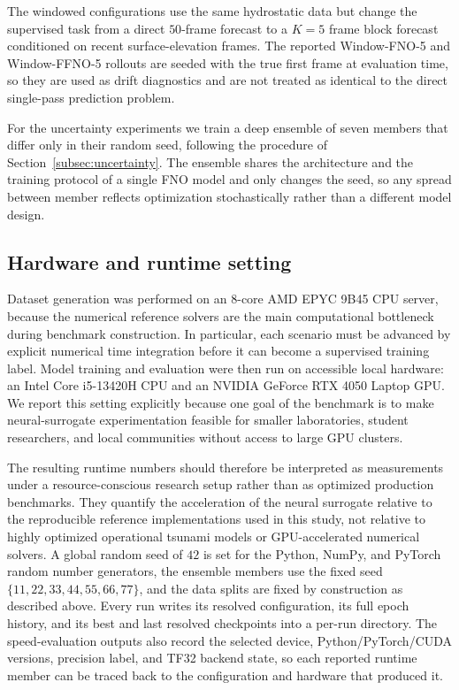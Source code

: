 The windowed configurations use the same hydrostatic data but change the supervised task from a direct $50$-frame forecast to a $K = 5$ frame block forecast conditioned on recent surface-elevation frames. The reported Window-FNO-5 and Window-FFNO-5 rollouts are seeded with the true first frame at evaluation time, so they are used as drift diagnostics and are not treated as identical to the direct single-pass prediction problem.

For the uncertainty experiments we train a deep ensemble of seven members that differ only in their random seed, following the procedure of Section~\ref{subsec:uncertainty}. The ensemble shares the architecture and the training protocol of a single FNO model and only changes the seed, so any spread between member reflects optimization stochastically rather than a different model design.

\subsection{Hardware and runtime setting}
\label{subsec:train-hardware}

Dataset generation was performed on an 8-core AMD EPYC 9B45 CPU server, because the numerical reference solvers are the main computational bottleneck during benchmark construction. In particular, each scenario must be advanced by explicit numerical time integration before it can become a supervised training label. Model training and evaluation were then run on accessible local hardware: an Intel Core i5-13420H CPU and an NVIDIA GeForce RTX 4050 Laptop GPU. We report this setting explicitly because one goal of the benchmark is to make neural-surrogate experimentation feasible for smaller laboratories, student researchers, and local communities without access to large GPU clusters.

The resulting runtime numbers should therefore be interpreted as measurements under a resource-conscious research setup rather than as optimized production benchmarks. They quantify the acceleration of the neural surrogate relative to the reproducible reference implementations used in this study, not relative to highly optimized operational tsunami models or GPU-accelerated numerical solvers. A global random seed of $42$ is set for the Python, NumPy, and PyTorch random number generators, the ensemble members use the fixed seed $\{11, 22, 33, 44, 55, 66, 77\}$, and the data splits are fixed by construction as described above. Every run writes its resolved configuration, its full epoch history, and its best and last resolved checkpoints into a per-run directory. The speed-evaluation outputs also record the selected device, Python/PyTorch/CUDA versions, precision label, and TF32 backend state, so each reported runtime member can be traced back to the configuration and hardware that produced it.
